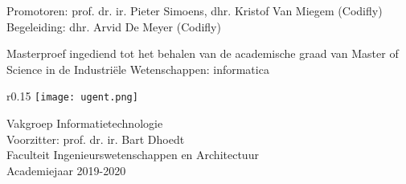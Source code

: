\begin{titlepage}
{\ugentfont

  \vspace*{0.37\textheight}

  \begin{huge}

    \thetitle

    \theauthor

  \end{huge}

  \vspace{3.5cm}

  \begin{Large}
    Promotoren: prof. dr. ir. Pieter Simoens, dhr. Kristof Van Miegem (Codifly)\\
    Begeleiding: dhr. Arvid De Meyer (Codifly)

    Masterproef ingediend tot het behalen van de academische graad van Master of Science in de Industriële Wetenschappen: informatica
  \end{Large}

  \vspace{1cm}

  \begin{Large}
    \begin{wrapfigure}{r}{0.15\textwidth}
      \texttt{[image: ugent.png]}
    \end{wrapfigure}

    Vakgroep Informatietechnologie\\
    Voorzitter: prof. dr. ir. Bart Dhoedt\\
    Faculteit Ingenieurswetenschappen en Architectuur\\
    Academiejaar 2019-2020
  \end{Large}
}
\end{titlepage}
